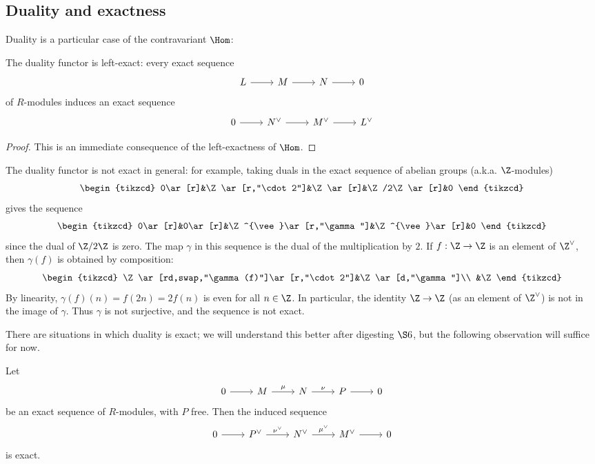 \subsection{Duality and exactness}
Duality is a particular case of the contravariant $\Hom$:
\begin{lemma}\label{dual left exact}
The duality functor is left-exact: every exact sequence
\[\begin{tikzcd}
L\ar[r]&M\ar[r]&N\ar[r]&0
\end{tikzcd}\]
of $R$-modules induces an exact sequence
\[\begin{tikzcd}
0\ar[r]&N^{\vee}\ar[r]&M^\vee\ar[r]&L^{\vee}
\end{tikzcd}\]
\begin{proof}
This is an immediate consequence of the left-exactness of $\Hom$.
\end{proof}
\end{lemma}
The duality functor is not exact in general: for example, taking duals in the exact sequence of abelian groups (a.k.a. $\Z$-modules)
\[\begin{tikzcd}
0\ar[r]&\Z\ar[r,"\cdot 2"]&\Z\ar[r]&\Z/2\Z\ar[r]&0
\end{tikzcd}\]
gives the sequence
\[\begin{tikzcd}
0\ar[r]&0\ar[r]&\Z^{\vee}\ar[r,"\gamma"]&\Z^{\vee}\ar[r]&0
\end{tikzcd}\]
since the dual of $\Z/2\Z$ is zero. The map $\gamma$ in this sequence is the dual of the multiplication by $2$. If $f:\Z\to\Z$ is an element of $\Z^{\vee}$, then $\gamma(f)$ is obtained by composition:
\[\begin{tikzcd}
\Z\ar[rd,swap,"\gamma(f)"]\ar[r,"\cdot 2"]&\Z\ar[d,"\gamma"]\\
&\Z
\end{tikzcd}\]
By linearity, $\gamma(f)(n)=f(2n)=2f(n)$ is even for all $n\in\Z$. In particular, the identity $\Z\to\Z$ (as an element of $\Z^{\vee}$) is not in the image of $\gamma$. Thus $\gamma$ is not
surjective, and the sequence is not exact.\par
There are situations in which duality is exact; we will understand this better
after digesting $\S 6$, but the following observation will suffice for now.
\begin{proposition}\label{Hom free exact}
Let
\[\begin{tikzcd}
0\ar[r]&M\ar[r,"\mu"]&N\ar[r,"\nu"]&P\ar[r]&0
\end{tikzcd}\]
be an exact sequence of $R$-modules, with $P$ free. Then the induced sequence
\[\begin{tikzcd}
0\ar[r]&P^{\vee}\ar[r,"\nu^\vee"]&N^{\vee}\ar[r,"\mu^{\vee}"]&M^{\vee}\ar[r]&0
\end{tikzcd}\]
is exact.
\end{proposition}
